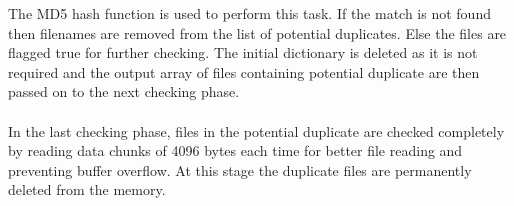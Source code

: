  The MD5 hash function is used to perform this task. If the match is not found then filenames are removed from the list of potential duplicates. Else the files are flagged true for further checking. The initial dictionary is deleted as it is not required and the output array of files containing potential duplicate are then passed on to the next checking phase.\\~\\
In the last checking phase, files in the potential duplicate are checked completely by reading data chunks of 4096 bytes each time for better file reading and preventing buffer overflow. At this stage the duplicate files are permanently deleted from the memory.



